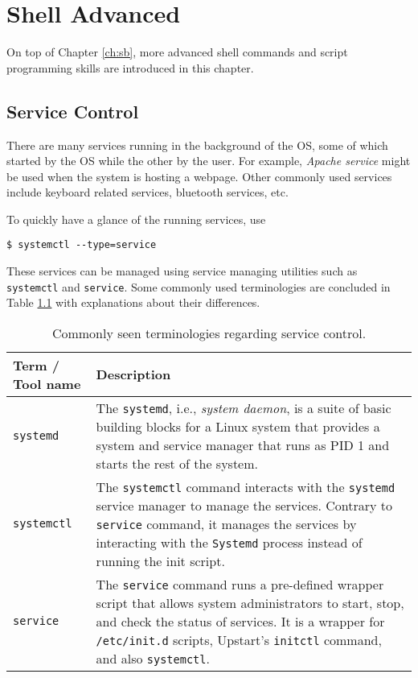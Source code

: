 \chapter{Shell Advanced} \label{ch:sa}

On top of Chapter \ref{ch:sb}, more advanced shell commands and script programming skills are introduced in this chapter.

\section{Service Control} \label{ch:sa:sec:sc}

There are many services running in the background of the OS, some of which started by the OS while the other by the user. For example, \textit{Apache service} might be used when the system is hosting a webpage. Other commonly used services include keyboard related services, bluetooth services, etc.

To quickly have a glance of the running services, use
\begin{lstlisting}
$ systemctl --type=service
\end{lstlisting}

These services can be managed using service managing utilities such as \verb|systemctl| and \verb|service|. Some commonly used terminologies are concluded in Table \ref{ch:sa:tab:servicecontroltools} with explanations about their differences.

\begin{table}
	\centering \caption{Commonly seen terminologies regarding service control.}\label{ch:sa:tab:servicecontroltools}
	\begin{tabularx}{\textwidth}{lX}
		\hline
		Term / Tool name & Description \\ \hline
		\verb|systemd| & The \verb|systemd|, i.e., \textit{system daemon}, is a suite of basic building blocks for a Linux system that provides a system and service manager that runs as PID 1 and starts the rest of the system.  \\ \hdashline
		\verb|systemctl| & The \verb|systemctl| command interacts with the \verb|systemd| service manager to manage the services. Contrary to \verb|service| command, it manages the services by interacting with the \verb|Systemd| process instead of running the init script.  \\ \hdashline
		\verb|service| & The \verb|service| command runs a pre-defined wrapper script that allows system administrators to start, stop, and check the status of services. It is a wrapper for \verb|/etc/init.d| scripts, Upstart's \verb|initctl| command, and also \verb|systemctl|. \\ \hline
	\end{tabularx}
\end{table}

